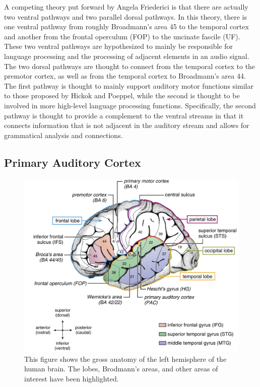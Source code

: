 \documentclass[titlepage]{article}
\begin{document}
  A competing theory put forward by Angela Friederici \cite{Friederici2011} is
  that there are actually two ventral pathways and two parallel dorsal pathways.
  In this theory, there is one ventral pathway from roughly Broadmann's area 45
  to the temporal cortex and another from the frontal operculum (FOP) to the
  uncinate fascile (UF). These two ventral pathways are hypothesized to mainly
  be responsible for language processing and the processing of adjacent elements
  in an audio signal. The two dorsal pathways are thought to connect from the
  temporal cortex to the premotor cortex, as well as from the temporal cortex
  to Broadmann's area 44. The first pathway is thought to mainly support
  auditory motor functions similar to those proposed by Hickok and Poeppel,
  while the second is thought to be involved in more high-level language
  processing functions. Specifically, the second pathway is thought to provide
  a complement to the ventral streams in that it connects information that
  is not adjacent in the auditory stream and allows for grammatical analysis
  and connections.

  \subsection{Primary Auditory Cortex} \label{primaryAuditoryCortex}

    \begin{figure}
      \centering
      \includegraphics[scale=0.25]{primaryAuditoryAnatomy}
      \caption{This figure shows the gross anatomy of the left hemisphere
      of the human brain. The lobes, Brodmann's areas, and other areas
      of interest have been highlighted. \cite{Friederici2011}}
      \label{primaryAuditoryAnatomy}
    \end{figure}
\end{document}
